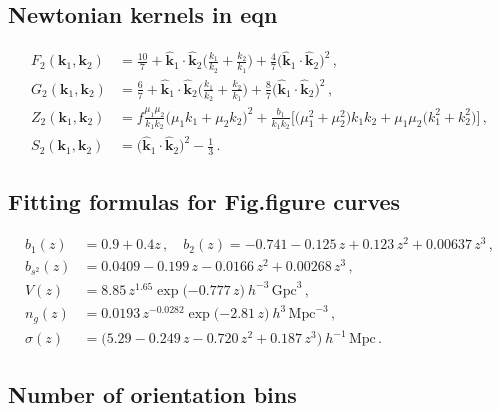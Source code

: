 \subsection*{Newtonian kernels in eqn}
\begin{align}
F_{2}(\bm{k}_{1}, \bm{k}_{2}) &= \frac{10}{7} + {\hat{\bm{k}}_{1} \cdot \hat{\bm{k}}_2}\bigg(\frac{k_{1}}{k_{2}} + \frac{k_{2}}{k_{1}}\bigg) + \frac{4}{7}\big({\hat{\bm{k}}_{1} \cdot \hat{\bm{k}}_2}\big)^{2}\,,
\label{e18} \\
G_{2}(\bm{k}_{1}, \bm{k}_{2}) &= \frac{6}{7} + {\hat{\bm{k}}_{1} \cdot \hat{\bm{k}}_2}\bigg(\frac{k_{1}}{k_{2}} + \frac{k_{2}}{k_{1}}\bigg) + \frac{8}{7}\big({\hat{\bm{k}}_{1} \cdot \hat{\bm{k}}_2}\big)^{2} \label{e19}\,,\\
Z_2(\bm{k}_1,\bm{k}_2) &=
 f \frac{\mu_1\mu_2}{k_1k_2}\big( \mu_1k_1+\mu_2k_2\big)^2 
+ \frac{b_{1}}{k_1k_2}\Big[ \big(\mu_1^2+\mu_2^2 \big)k_1k_2+\mu_1\mu_2\big(k_1^2+k_2^2 \big) \Big]\,, \label{e16x} \\  
S_{2}(\bm{k}_{1}, \bm{k}_{2}) &= \big({\hat{\bm{k}}_{1} \cdot \hat{\bm{k}}_2}\big)^{2} - \frac{1}{3}\,. \label{e20}
\end{align}

\subsection*{Fitting formulas for Fig.figure curves}
\begin{align}
b_1(z) &= 0.9+0.4 z\,, \quad b_2(z) = -0.741 - 0.125\,z + 0.123\,z^{2} + 0.00637\,z^{3}\,, \label{e9}  \\
 b_{s^2}(z) &= 0.0409 - 0.199\,z - 0.0166\,z^{2} + 0.00268\,z^{3} \,, \label{e11} \\
 V(z) &= 8.85\, z^{1.65}\exp\big({-0.777\,z}\big)~ h^{-3}\,\mathrm{Gpc}^{3}\,, \label{e11_1} \\
n_{g}(z) &= 0.0193\, z^{-0.0282}\exp\big({-2.81\,z}\big) ~h^{3}\,\mathrm{Mpc}^{-3}\,,
 \label{e11_2}\\
\sigma(z)& = \big(5.29 - 0.249\,z - 0.720\,z^{2} + 0.187\,z^{3}\big)~h^{-1}\,\mathrm{Mpc}\,. \label{e14a}
\end{align}


\subsection*{{Number of orientation bins}}


